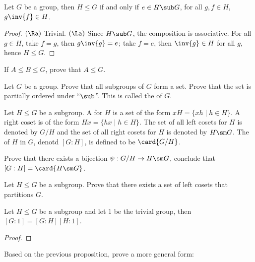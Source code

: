 \documentclass[10pt]{article}
\begin{document}
\begin{proposition}
    Let $G$ be a group, then $H\le G$ if and only if $e\in H\sub G$, for all $g,f\in H$, $g\inv{f}\in H$. 
\end{proposition}
\begin{proof}
    $(\Ra)$ Trivial. $(\La)$ Since $H\sub G$, the composition is associative. For all $g\in H$, take $f=g$, then $g\inv{g}=e$; take $f=e$, then $\inv{g}\in H$ for all $g$, hence $H\le G$.
\end{proof}
\begin{problem}
    If $A\le B\le G$, prove that $A\le G$.
\end{problem}
\begin{problem}
    Let $G$ be a group. Prove that all subgroups of $G$ form a set. Prove that the set is partially ordered under ``$\sub$''. This is called the  of $G$.
\end{problem}
\begin{definition}
    Let $H\le G$ be a subgroup. A  for $H$ is a set of the form $xH=\{xh\mid h\in H\}$. A right coset is of the form $Hx=\{hx\mid h\in H\}$. The set of all left cosets for $H$ is denoted by $G/H$ and the set of all right cosets for $H$ is denoted by $H\sm G$. The  of $H$ in $G$, denotd $[G:H]$, is defined to be $\card{G/H}$.
\end{definition}
\begin{problem}
    Prove that there exists a bijection $\psi:G/H\to H\sm G$, conclude that $[G:H]=\card{H\sm G}$.
\end{problem}
\begin{problem}
    Let $H\le G$ be a subgroup. Prove that there exists a set of left cosets that partitions $G$.
\end{problem}
\begin{proposition}
    Let $H\le G$ be a subgroup and let 1 be the trivial group, then $[G:1]=[G:H][H:1]$.
\end{proposition}
\begin{proof}
    
\end{proof}
\begin{problem}
    Based on the previous proposition, prove a more general form: 
\end{problem}
\end{document}
